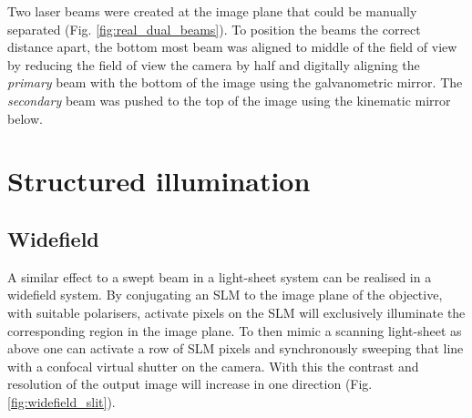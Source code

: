 Two laser beams were created at the image plane that could be manually separated (Fig. \ref{fig:real_dual_beams}).
To position the beams the correct distance apart, the bottom most beam was aligned to middle of the field of view by reducing the field of view the camera by half and digitally aligning the \emph{primary} beam with the bottom of the image using the galvanometric mirror.
The \emph{secondary} beam was pushed to the top of the image using the kinematic mirror below.

%  
%  

\section{Structured illumination}


\subsection{Widefield}

A similar effect to a swept beam in a light-sheet system can be realised in a widefield system.
By conjugating an SLM to the image plane of the objective, with suitable polarisers, activate pixels on the SLM will exclusively illuminate the corresponding region in the image plane.
To then mimic a scanning light-sheet as above one can activate a row of SLM pixels and synchronously sweeping that line with a confocal virtual shutter on the camera.
With this the contrast and resolution of the output image will increase in one direction (Fig. \ref{fig:widefield_slit}).

